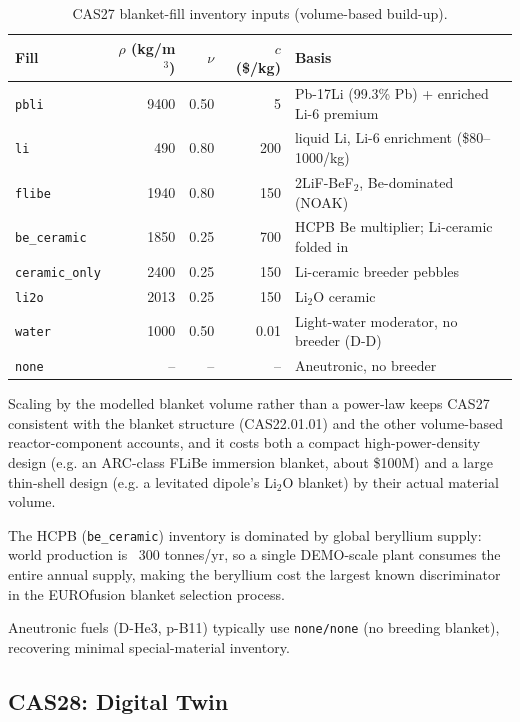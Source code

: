 \documentclass{article}
\begin{document}
\begin{table}[h]
\centering
\caption{CAS27 blanket-fill inventory inputs (volume-based build-up).}
\label{tab:cas27_fills}
\begin{tabular}{lrrrl}
\toprule
Fill & $\rho$ (kg/m$^3$) & $\nu$ & $c$ (\$/kg) & Basis \\
\midrule
\texttt{pbli}          & 9400 & 0.50 & 5   & Pb-17Li (99.3\% Pb) + enriched Li-6 premium \\
\texttt{li}            & 490  & 0.80 & 200 & liquid Li, Li-6 enrichment (\$80--1000/kg) \\
\texttt{flibe}         & 1940 & 0.80 & 150 & 2LiF-BeF$_2$, Be-dominated (NOAK) \\
\texttt{be\_ceramic}   & 1850 & 0.25 & 700 & HCPB Be multiplier; Li-ceramic folded in \\
\texttt{ceramic\_only} & 2400 & 0.25 & 150 & Li-ceramic breeder pebbles \\
\texttt{li2o}          & 2013 & 0.25 & 150 & Li$_2$O ceramic \\
\texttt{water}         & 1000 & 0.50 & 0.01 & Light-water moderator, no breeder (D-D) \\
\texttt{none}          & --   & --   & --  & Aneutronic, no breeder \\
\bottomrule
\end{tabular}
\end{table}

Scaling by the modelled blanket volume rather than a power-law keeps
CAS27 consistent with the blanket structure (CAS22.01.01) and the other
volume-based reactor-component accounts, and it costs both a compact
high-power-density design (e.g. an ARC-class FLiBe immersion blanket,
about \$100M) and a large thin-shell design (e.g. a levitated dipole's
Li$_2$O blanket) by their actual material volume.

The HCPB (\texttt{be\_ceramic}) inventory is dominated by global
beryllium supply: world production is ~300 tonnes/yr, so a single
DEMO-scale plant consumes the entire annual supply, making the
beryllium cost the largest known discriminator in the EUROfusion
blanket selection process.

Aneutronic fuels (D-He3, p-B11) typically use \texttt{none/none} (no
breeding blanket), recovering minimal special-material inventory.


\subsection{CAS28: Digital Twin}
\label{sec:cas28}
\end{document}
